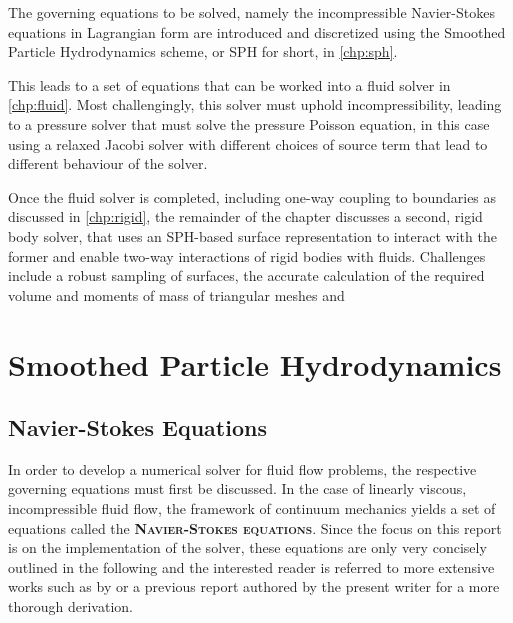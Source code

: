 \documentclass[oneside, a4paper]{book}
\newcommand\emphasis[1]{{\scshape\bfseries#1}}
\begin{document}
The governing equations to be solved, namely the incompressible Navier-Stokes equations in Lagrangian form are introduced and discretized using the Smoothed Particle Hydrodynamics scheme, or SPH for short, in \autoref{chp:sph}. 

This leads to a set of equations that can be worked into a fluid solver in \autoref{chp:fluid}. Most challengingly, this solver must uphold incompressibility, leading to a pressure solver that must solve the pressure Poisson equation, in this case using a relaxed Jacobi solver with different choices of source term that lead to different behaviour of the solver. 

Once the fluid solver is completed, including one-way coupling to boundaries as discussed in \autoref{chp:rigid}, the remainder of the chapter discusses a second, rigid body solver, that uses an SPH-based surface representation to interact with the former and enable two-way interactions of rigid bodies with fluids. Challenges include a robust sampling of surfaces, the accurate calculation of the required volume and moments of mass of triangular meshes and 


\chapter{Smoothed Particle Hydrodynamics}\label{chp:sph}
    \section{Navier-Stokes Equations}\label{sec:navier-stokes}
    In order to develop a numerical solver for fluid flow problems, the respective governing equations must first be discussed. In the case of linearly viscous, incompressible fluid flow, the framework of continuum mechanics yields a set of equations called the \emphasis{Navier-Stokes equations}. Since the focus on this report is on the implementation of the solver, these equations are only very concisely outlined in the following and the interested reader is referred to more extensive works such as by \cite[Anderson]{anderson} or a previous report authored by the present writer \autocite{labcourse} for a more thorough derivation.
\end{document}
